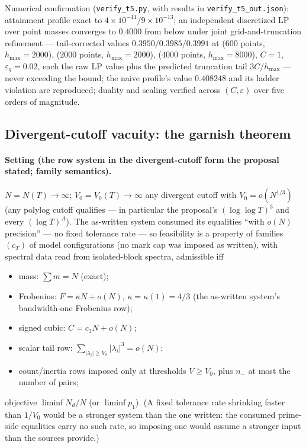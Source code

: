 \documentclass[11pt]{article}
\theoremstyle{plain}
\theoremstyle{definition}
\theoremstyle{remark}
\newcommand{\Nd}{N_{d}}
\begin{document}
Numerical confirmation (\texttt{verify\_t5.py}, with results in
\texttt{verify\_t5\_}\allowbreak\texttt{out.json}): attainment profile exact
to $4 \times 10^{-11} / 9 \times 10^{-13}$; an independent discretized LP over
point masses converges to $0.4000$ from below under joint grid-and-truncation
refinement --- tail-corrected values $0.3950 / 0.3985 / 0.3991$ at
($600$ points, $h_{\max} = 2000$), ($2000$ points, $h_{\max} = 2000$),
($4000$ points, $h_{\max} = 8000$), $C = 1$, $\varepsilon_g = 0.02$, each the raw
LP value plus the predicted truncation tail $3C/h_{\max}$ --- never exceeding the
bound; the naive profile's value $0.408248$ and its ladder violation are
reproduced; duality and scaling verified across $(C, \varepsilon)$ over five
orders of magnitude.

\subsection{Divergent-cutoff vacuity: the garnish theorem}

\paragraph{Setting (the row system in the divergent-cutoff form the proposal
stated; family semantics).}
$N = N(T) \to \infty$; $V_0 = V_0(T) \to \infty$ any divergent cutoff with
$V_0 = o(N^{1/3})$ (any polylog cutoff qualifies --- in particular the proposal's
$(\log\log T)^3$ and every $(\log T)^A$). The as-written system consumed its
equalities ``with $o(N)$ precision'' --- no fixed tolerance rate --- so
feasibility is a property of families $(c_T)$ of model configurations (no mark cap
was imposed as written), with spectral data read from isolated-block spectra,
admissible iff
\begin{itemize}
\item[(W1)] mass: $\sum m = N$ (exact);
\item[(W2)] Frobenius: $F = \kappa N + o(N)$, $\kappa = \kappa(1) = 4/3$ (the
  as-written system's bandwidth-one Frobenius row);
\item[(W3)] signed cubic: $C = c_3 N + o(N)$;
\item[(W4)] scalar tail row:
  $\sum_{|\lambda_i| \ge V_0} |\lambda_i|^3 = o(N)$;
\item[(W5)] count/inertia rows imposed only at thresholds $V \ge V_0$, plus
  $n_-$ at most the number of pairs;
\end{itemize}
objective $\liminf \Nd/N$ (or $\liminf p_1$). (A fixed tolerance rate shrinking
faster than $1/V_0$ would be a stronger system than the one written: the
consumed prime-side equalities carry no such rate, so imposing one would assume
a stronger input than the sources provide.)
\end{document}
